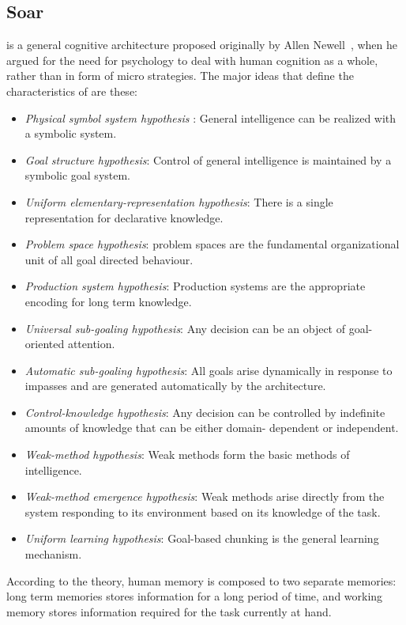 
\subsection{Soar}

\soar is a general cognitive architecture proposed originally by Allen
Newell~\cite{Newell:1990aa,27702}, when he argued for the need for
psychology to deal with human cognition as a whole, rather than in
form of micro strategies. The major ideas\cite{Lewis:2001aa, 27702} that
define the characteristics of \soar are these:

\begin{itemize}
\item \emph{Physical symbol system hypothesis} : General intelligence
  can be realized with a symbolic system\cite{Newell1980135}.
\item \emph{Goal structure hypothesis}: Control of general
  intelligence is maintained by a symbolic goal system.
\item \emph{Uniform elementary-representation hypothesis}: There is a
  single representation for declarative knowledge.
\item \emph{Problem space hypothesis}: problem spaces are the
  fundamental organizational unit of all goal directed behaviour.
\item \emph{Production system hypothesis}: Production systems are the
  appropriate encoding for long term knowledge.
\item \emph{Universal sub-goaling hypothesis}: Any decision can be an
  object of goal-oriented attention.
\item \emph{Automatic sub-goaling hypothesis}: All goals arise
  dynamically in response to impasses and are generated automatically
  by the architecture.
\item \emph{Control-knowledge hypothesis}: Any decision can be
  controlled by indefinite amounts of knowledge that can be either domain-
  dependent or independent.
\item \emph{Weak-method hypothesis}:  Weak methods form the basic
  methods of intelligence. %
\item \emph{Weak-method emergence hypothesis}:  Weak methods arise
  directly from the system responding to its environment based on its knowledge of the
  task.
\item \emph{Uniform learning hypothesis}: Goal-based chunking is the
  general learning mechanism.
\end{itemize}
According to the \soar theory, human memory is composed to two
separate memories: long term memories stores information for a long
period of time, and working memory stores information required for the
task currently at hand.

